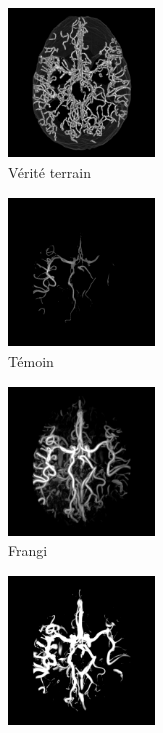\begin{figure}[!ht]

  \captionsetup[subfigure]{justification=centering}
  \begin{subfigure}[t]{0.32\textwidth}
  \includegraphics[clip = true, trim = 90 20 90 20, height=4cm,width=3.9cm]{Images/Bullitt_GT.png}
  \caption{Vérité terrain}
\end{subfigure}
  \begin{subfigure}[t]{0.32\textwidth}
  \includegraphics[clip = true, trim = 90 20 90 20, height=4cm,width=3.9cm]{Images/Bullitt_Baseline.png}
  \caption{Témoin}
  \end{subfigure}
  \begin{subfigure}[t]{0.32\textwidth}
  \includegraphics[clip = true, trim = 90 20 90 20, height=4cm,width=3.9cm]{Images/Bullitt_Frangi.png}
  \caption{Frangi}
  \end{subfigure}
  \begin{subfigure}[t]{0.32\textwidth}
  \includegraphics[clip = true, trim = 90 20 90 20, height=4cm,width=3.9cm]{Images/Bullitt_Jerman.png}

\end{subfigure}
\end{figure}
